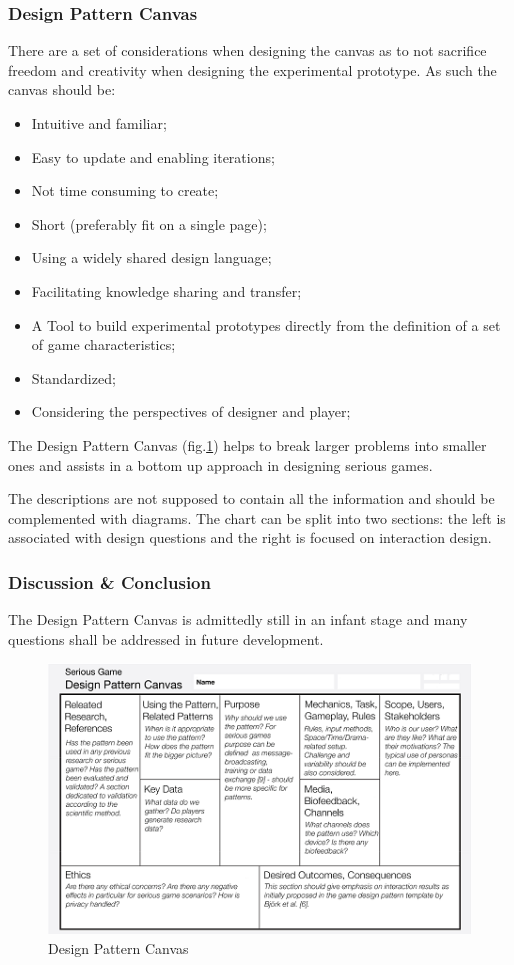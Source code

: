 \documentclass[runningheads]{llncs}
\begin{document}
\subsubsection{Design Pattern Canvas}
\par There are a set of considerations when designing the canvas as to not sacrifice freedom and creativity when designing the experimental prototype. As such the canvas should be:
\begin{itemize}
    \item Intuitive and familiar;
    \item Easy to update and enabling iterations;
    \item Not time consuming to create;
    \item Short (preferably fit on a single page);
    \item Using a widely shared design language;
    \item Facilitating knowledge sharing and transfer;
    \item A Tool to build experimental prototypes directly from the definition of a set of game characteristics;
    \item Standardized;
    \item Considering the perspectives of designer and player;
\end{itemize}

The Design Pattern Canvas (fig.\ref{fig:DPC}) helps to break larger problems into smaller ones and assists in a bottom up approach in designing serious games.
\par The descriptions are not supposed to contain all the information and should be complemented with diagrams. The chart can be split into two sections: the left is associated with design questions and the right is focused on interaction design.

\subsubsection{Discussion \& Conclusion}
\par The Design Pattern Canvas is admittedly still in an infant stage and many questions shall be addressed in future development.
\begin{figure}
    \centering
    \includegraphics{Screenshot_20.png}
    \caption{Design Pattern Canvas}
    \label{fig:DPC}
\end{figure}
\end{document}
